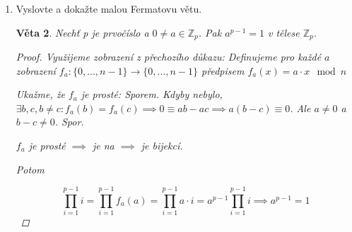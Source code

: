 \documentclass[10pt,a4paper]{article}
\theoremstyle{plain}
\newtheorem{veta}{Věta}
\theoremstyle{definition}
\begin{document}
\begin{enumerate}
\begin{veta}
\begin{proof}
\begin{enumerate}[label=(\alph*)]
\begin{itemize}
Zvolme libovolnou hranu $e$, BÚNO $e = (v_1, v_2)$.
Nechť $A = L_{G}^{1,1}$, $B = L_{G \setminus e}^{1,1}$, $A = L_{G \circ e}^{1,1}$



$A$ a $B$ jsou shodné až na $a_{1,1} - 1 = b_{1,1}$. První sloupec $A$ vyjádříme jako součet prvního sloupce $B$ a elementárního vektoru $e^1$

\[\det(A) = \det(B) + \det\left(\ \begin{array}{|c|c|}
\hline 1 & 0^T \\  \hline  0 & C \\ \hline
\end{array} \ \right) = \det(B) + \det(C)\]

Počet koster můžeme vyjádřit rekurentním vztahem
\[ \kappa(G) = \kappa(G \setminus e) + \kappa(G \circ e) \overset{IP}{=} \det(B) + \det(C) = det(A) \]

\end{itemize}
\end{enumerate}
\end{proof}
\end{veta}

\item Vyslovte a dokažte malou Fermatovu větu.


\begin{veta}

Nechť p je prvočíslo a $0 \neq a \in \mathbb{Z}_p$. Pak $a^{p-1} = 1$ v tělese $\mathbb{Z}_p$.

\begin{proof}
Využijeme zobrazení z přechozího důkazu: 
Definujeme pro každé $a$ zobrazení $f_a: \{0, ..., n-1 \} \to \{0, ..., n-1 \}$ předpisem $f_a(x) = a \cdot x \mod n$

Ukažme, že $f_a$ je prosté: Sporem. Kdyby nebylo, $\exists b,c, b \neq c: f_a(b) = f_a(c) \implies 0 \equiv ab-ac \implies a (b-c) \equiv 0$. Ale $a \neq 0$ a $b-c \neq 0$. Spor.

$f_a$ je prosté $\implies$ je na $\implies$ je bijekcí.

Potom 

\begin{equation*}
\prod_{i=1}^{p-1} i = \prod_{i=1}^{p-1} f_a(a) = \prod_{i=1}^{p-1} a\cdot i = a^{p-1} \prod_{i=1}^{p-1} i  \implies a^{p-1} = 1
\end{equation*}
\end{proof}
\end{veta}


\end{enumerate}
\end{document}
